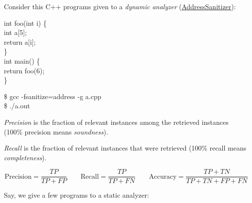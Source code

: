 \documentclass{article}
\begin{document}
\plush{}


Consider this C++ programs given to a \emph{dynamic analyzer}
(\href{https://en.wikipedia.org/wiki/Code_sanitizer}{AddressSanitizer}):

\begin{pptWideOne}
\begin{multicols}{2}
{\ttfamily
int foo(int i) \{ \\
\quad int a[5]; \\
\quad return a[i]; \\
\} \\
int main() \{ \\
\quad return foo(6); \\
\}}
\par\columnbreak\par
{\ttfamily
\$ gcc -fsanitize=address -g a.cpp \\
\$ ./a.out}

\end{multicols}
\end{pptWideOne}

\plush{}




\plush{}


\emph{Precision} is the fraction of relevant instances among the retrieved instances (100\% precision means \emph{soundness}).

\emph{Recall} is the fraction of relevant instances that were retrieved (100\% recall means \emph{completeness}).

\begin{pptWideOne}
\begin{equation*}
\text{Precision} = \frac{TP}{TP + FP}
\quad\quad
\text{Recall} = \frac{TP}{TP + FN}
\quad\quad
\text{Accuracy} = \frac{TP + TN}{TP + TN + FP + FN}
\end{equation*}
\end{pptWideOne}

\plush{}


Say, we give a few programs to a static analyzer:
\end{document}
